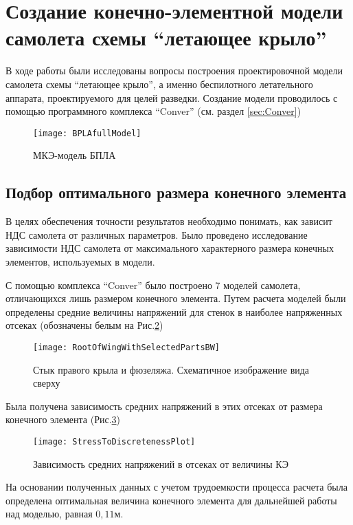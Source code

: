 \section{Создание конечно-элементной модели самолета схемы ``летающее крыло''}

В ходе работы были исследованы вопросы построения проектировочной модели самолета схемы ``летающее крыло'', а именно беспилотного летательного аппарата, проектируемого для целей разведки. Создание модели проводилось с помощью программного комплекса ``Conver'' (см. раздел \ref{sec:Conver})

\begin{figure}[ht]
\centering
\texttt{[image: BPLAfullModel]}
\caption{МКЭ-модель БПЛА}
\label{fig:BPLAfullModel}
\end{figure}

\subsection{Подбор оптимального размера конечного элемента}

В целях обеспечения точности результатов необходимо понимать, как зависит НДС самолета от различных параметров. Было проведено исследование зависимости НДС самолета от максимального характерного размера конечных элементов, используемых в модели. 

С помощью комплекса ``Conver'' было построено 7 моделей самолета, отличающихся лишь размером конечного элемента. Путем расчета моделей были определены средние величины напряжений для стенок в наиболее напряженных отсеках (обозначены белым на  Рис.\ref{fig:WingRootPlain})

\begin{figure}[ht]
\centering
\texttt{[image: RootOfWingWithSelectedPartsBW]}
\caption{Стык правого крыла и фюзеляжа. Схематичное изображение вида сверху}
\label{fig:WingRootPlain}
\end{figure}




Была получена зависимость средних напряжений в этих отсеках от размера конечного элемента (Рис.\ref{fig:stressToDiscreteness})
\begin{figure}[ht]
\centering
\texttt{[image: StressToDiscretenessPlot]}
\caption{Зависимость средних напряжений в отсеках от величины КЭ}
\label{fig:stressToDiscreteness}
\end{figure}

На основании полученных данных с учетом трудоемкости процесса расчета была определена оптимальная величина конечного элемента для дальнейшей работы над моделью, равная $0,11\text{м}$. 
